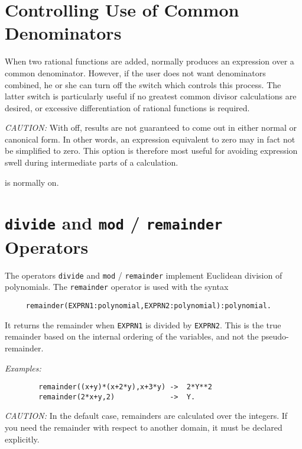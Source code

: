 \section{Controlling Use of Common Denominators}
\hypertarget{switch:MCD}{}
When two rational functions are added, {\REDUCE} normally produces an
expression over a common denominator. However, if the user does not want
denominators combined, he or she can turn off the switch 
 which controls this process.  The latter switch is
particularly useful if no greatest common divisor calculations are
desired, or excessive differentiation of rational functions is required.

\textit{CAUTION:}  With  off, results are not guaranteed to come out in
either normal or canonical form.  In other words, an expression equivalent
to zero may in fact not be simplified to zero.  This option is therefore
most useful for avoiding expression swell during intermediate parts of a
calculation.

 is normally on.

\section{\texttt{divide} and \texttt{mod} / \texttt{remainder} Operators}
\hypertarget{operator:divide}{}
\hypertarget{operator:remainder}{}
\hypertarget{operator:mod}{}

The operators \texttt{divide} and \texttt{mod} / \texttt{remainder} implement Euclidean division
of polynomials. 
The \texttt{remainder} operator is used with the syntax
\begin{verbatim}
     remainder(EXPRN1:polynomial,EXPRN2:polynomial):polynomial.
\end{verbatim}
It returns the remainder when \texttt{EXPRN1} is divided by \texttt{EXPRN2}.  This
is the true remainder based on the internal ordering of the variables, and
not the pseudo-remainder. 

\textit{Examples:}
\begin{verbatim}
        remainder((x+y)*(x+2*y),x+3*y) ->  2*Y**2
        remainder(2*x+y,2)             ->  Y.
\end{verbatim}

\textit{CAUTION:} In the default case, remainders are calculated over the
integers.  If you need the remainder with respect to another domain, it
must be declared explicitly.

